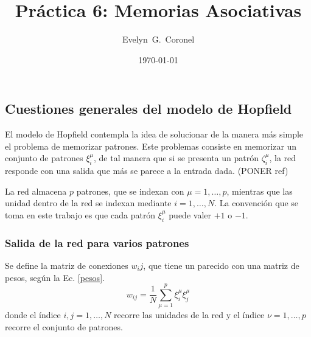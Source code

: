 



\title{Práctica 6: Memorias Asociativas}
\author{Evelyn~G.~Coronel}


\date[]{\lowercase{\today}} %


\maketitle
%

\subsection*{Cuestiones generales del modelo  de Hopfield}

El modelo de Hopfield contempla la idea de solucionar de la manera más simple el problema de memorizar patrones. Este problemas consiste en memorizar un conjunto de patrones $\xi^\mu _i$, de tal manera que si se presenta un patrón $\zeta^\mu_i$, la red responde con una salida que más se parece a la entrada dada. (PONER ref)

La red almacena $p$ patrones, que se indexan con $\mu=1, \dots, p$, mientras que las unidad dentro de la red se indexan mediante $i=1, \dots, N$. La convención que se toma en este trabajo es que cada patrón $\xi^\mu _i$ puede valer $+1$ o $-1$.
\subsubsection*{Salida de la red  para varios patrones}

Se define la matriz de conexiones $w_ij$, que tiene un parecido con una matriz de pesos, según la Ec. \ref{pesos}.
\begin{equation}
	w_{ij} = \frac{1}{N} \sum _{\mu=1} ^{p}\xi_i^\mu \xi_j^\mu 
	\label{pesos}
\end{equation}
donde el índice $i, j= 1, \dots , N$ recorre las unidades de la red y el índice $\nu= 1, \dots, p$ recorre el conjunto de patrones.


